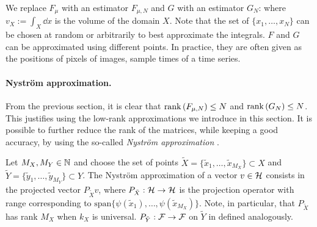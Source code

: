 We replace $F_\mu$ with an estimator $F_{\mu, N}$ and $G$ with an estimator $G_N$:
where $v_X := \int_X \dd x$ is the volume of the domain $X$.
Note that the set of $\lbrace x_1, \ldots, x_N \rbrace$ can be chosen at random or arbitrarily to best approximate the integrals. $F$ and $G$ can be approximated using different points. In practice, they are often given as the positions of pixels of images, sample times of a time series.

\paragraph{Nyström approximation.}

From the previous section, it is clear that $\operatorname{rank}\left(F_{\mu, N}\right) \leq N$ and $\operatorname{rank}\left(G_N\right) \leq N$. This justifies using the low-rank approximations we introduce in this section. It is possible to further reduce the rank of the matrices, while keeping a good accuracy, by using the so-called {\em Nystr\"om approximation} \cite{williams2001using,drineas2005nystrom,rudi2015less}.

Let $M_X, M_Y \in \mathbb N$ and choose the set of points $\widetilde{X} = \lbrace \widetilde x_1, \ldots, \widetilde x_{M_X}\rbrace \subset X$ and $\widetilde{Y} = \lbrace \widetilde y_1, \ldots, \widetilde y_{M_Y} \} \subset Y$. The Nystr\"om approximation of a vector $v \in \mathcal H$ consists in the projected vector $P_{\tilde{X}} v$, where $P_{\tilde{X}} :\mathcal H \to \mathcal H$ is the projection operator with range corresponding to $\textrm{span} \{\psi(\tilde{x}_1),\dots,\psi(\tilde{x}_{M_X})\}$. Note, in particular, that $P_{\tilde{X}}$ has rank $M_X$ when $k_X$ is universal. $P_{\tilde{Y}}: {\cal F} \to {\cal F}$ on $\tilde{Y}$ in defined analogously.


